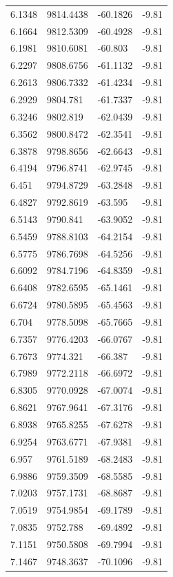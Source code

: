 \begin{table}[H]
\begin{tabular}{llll}
6.1348 & 9814.4438 & -60.1826 & -9.81 \\
6.1664 & 9812.5309 & -60.4928 & -9.81 \\
6.1981 & 9810.6081 & -60.803 & -9.81 \\
6.2297 & 9808.6756 & -61.1132 & -9.81 \\
6.2613 & 9806.7332 & -61.4234 & -9.81 \\
6.2929 & 9804.781 & -61.7337 & -9.81 \\
6.3246 & 9802.819 & -62.0439 & -9.81 \\
6.3562 & 9800.8472 & -62.3541 & -9.81 \\
6.3878 & 9798.8656 & -62.6643 & -9.81 \\
6.4194 & 9796.8741 & -62.9745 & -9.81 \\
6.451 & 9794.8729 & -63.2848 & -9.81 \\
6.4827 & 9792.8619 & -63.595 & -9.81 \\
6.5143 & 9790.841 & -63.9052 & -9.81 \\
6.5459 & 9788.8103 & -64.2154 & -9.81 \\
6.5775 & 9786.7698 & -64.5256 & -9.81 \\
6.6092 & 9784.7196 & -64.8359 & -9.81 \\
6.6408 & 9782.6595 & -65.1461 & -9.81 \\
6.6724 & 9780.5895 & -65.4563 & -9.81 \\
6.704 & 9778.5098 & -65.7665 & -9.81 \\
6.7357 & 9776.4203 & -66.0767 & -9.81 \\
6.7673 & 9774.321 & -66.387 & -9.81 \\
6.7989 & 9772.2118 & -66.6972 & -9.81 \\
6.8305 & 9770.0928 & -67.0074 & -9.81 \\
6.8621 & 9767.9641 & -67.3176 & -9.81 \\
6.8938 & 9765.8255 & -67.6278 & -9.81 \\
6.9254 & 9763.6771 & -67.9381 & -9.81 \\
6.957 & 9761.5189 & -68.2483 & -9.81 \\
6.9886 & 9759.3509 & -68.5585 & -9.81 \\
7.0203 & 9757.1731 & -68.8687 & -9.81 \\
7.0519 & 9754.9854 & -69.1789 & -9.81 \\
7.0835 & 9752.788 & -69.4892 & -9.81 \\
7.1151 & 9750.5808 & -69.7994 & -9.81 \\
7.1467 & 9748.3637 & -70.1096 & -9.81 \\

\end{tabular}
\end{table}
